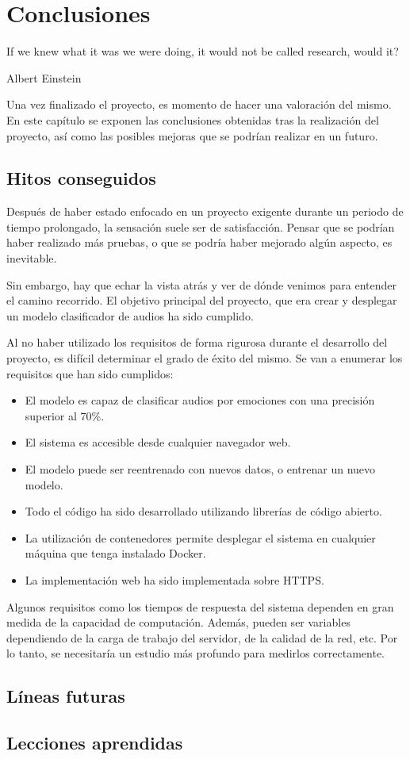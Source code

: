 \chapter{Conclusiones}\label{chp-04}

\epigraph{If we knew what it was we were doing, it would not be called research, would it?}{Albert Einstein}

Una vez finalizado el proyecto, es momento de hacer una valoración del mismo. 
En este capítulo se exponen las conclusiones obtenidas tras la realización del proyecto, así como las posibles mejoras que se podrían realizar en un futuro.

\section{Hitos conseguidos}
Después de haber estado enfocado en un proyecto exigente durante un periodo de tiempo prolongado, la sensación suele ser de satisfacción.
Pensar que se podrían haber realizado más pruebas, o que se podría haber mejorado algún aspecto, es inevitable.

Sin embargo, hay que echar la vista atrás y ver de dónde venimos para entender el camino recorrido.
El objetivo principal del proyecto, que era crear y desplegar un modelo clasificador de audios ha sido cumplido.

Al no haber utilizado los requisitos de forma rigurosa durante el desarrollo del proyecto, es difícil determinar el grado de éxito del mismo.
Se van a enumerar los requisitos que han sido cumplidos:

\begin{itemize}
    \item El modelo es capaz de clasificar audios por emociones con una precisión superior al 70\%.
    \item El sistema es accesible desde cualquier navegador web.
    \item El modelo puede ser reentrenado con nuevos datos, o entrenar un nuevo modelo.
    \item Todo el código ha sido desarrollado utilizando librerías de código abierto.
    \item La utilización de contenedores permite desplegar el sistema en cualquier máquina que tenga instalado Docker.
    \item La implementación web ha sido implementada sobre HTTPS.
\end{itemize}

Algunos requisitos como los tiempos de respuesta del sistema dependen en gran medida de la capacidad de computación.
Además, pueden ser variables dependiendo de la carga de trabajo del servidor, de la calidad de la red, etc.
Por lo tanto, se necesitaría un estudio más profundo para medirlos correctamente.

\section{Líneas futuras}

\section{Lecciones aprendidas}